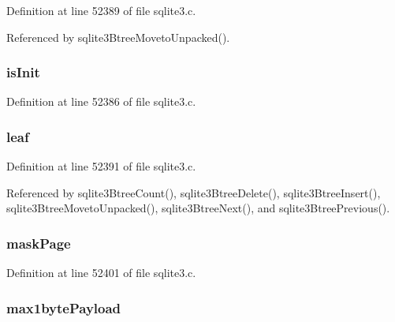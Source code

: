 Definition at line 52389 of file sqlite3.\+c.



Referenced by sqlite3\+Btree\+Moveto\+Unpacked().

\hypertarget{struct_mem_page_a7318e02c1fe25199c0198f703c630337}{}
\subsubsection[{is\+Init}]{ is\+Init}\label{struct_mem_page_a7318e02c1fe25199c0198f703c630337}


Definition at line 52386 of file sqlite3.\+c.

\hypertarget{struct_mem_page_a72158adbdb111e2d20c18fdbe71fbd28}{}
\subsubsection[{leaf}]{ leaf}\label{struct_mem_page_a72158adbdb111e2d20c18fdbe71fbd28}


Definition at line 52391 of file sqlite3.\+c.



Referenced by sqlite3\+Btree\+Count(), sqlite3\+Btree\+Delete(), sqlite3\+Btree\+Insert(), sqlite3\+Btree\+Moveto\+Unpacked(), sqlite3\+Btree\+Next(), and sqlite3\+Btree\+Previous().

\hypertarget{struct_mem_page_ae5f02929a64d10719bd0186687524afd}{}
\subsubsection[{mask\+Page}]{ mask\+Page}\label{struct_mem_page_ae5f02929a64d10719bd0186687524afd}


Definition at line 52401 of file sqlite3.\+c.

\hypertarget{struct_mem_page_ae108776c319d9bbb89d5f8ededa5635b}{}
\subsubsection[{max1byte\+Payload}]{ max1byte\+Payload}\label{struct_mem_page_ae108776c319d9bbb89d5f8ededa5635b}


